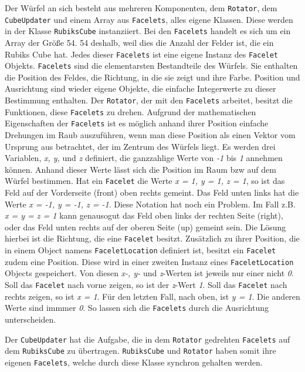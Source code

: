 Der Würfel an sich besteht aus mehreren Komponenten, dem \texttt{Rotator}, dem \texttt{CubeUpdater}
und einem Array aus \texttt{Facelets}, alles eigene Klassen. Diese werden in der Klasse
\texttt{RubiksCube} instanziiert. Bei den \texttt{Facelets} handelt es sich um ein
Array der Größe 54. 54 deshalb, weil dies die Anzahl der Felder ist, die ein
Rubiks Cube hat. Jedes dieser \texttt{Facelets} ist eine eigene Instanz des \texttt{Facelet} Objekts.
\texttt{Facelets} sind die elementarsten Bestandteile des Würfels. Sie enthalten die
Position des Feldes, die Richtung, in die sie zeigt und ihre Farbe. Position und
Ausrichtung sind wieder eigene Objekte, die einfache Integerwerte zu dieser
Bestimmung enthalten.
Der \texttt{Rotator}, der mit den \texttt{Facelets} arbeitet, besitzt die Funktionen, diese \texttt{Facelets}
zu drehen. Aufgrund der mathematischen Eigenschaften der \texttt{Facelets} ist es möglich
anhand ihrer Position einfache Drehungen im Raub auszuführen, wenn man diese
Position als einen Vektor vom Ursprung aus betrachtet, der im Zentrum des Würfels
liegt. Es werden drei Variablen, \emph{x, y,} und \emph{z} definiert, die ganzzahlige Werte
von \emph{-1} bis \emph{1} annehmen können. Anhand dieser Werte lässt sich die Position im Raum
bzw auf dem Würfel bestimmen. Hat ein \texttt{Facelet} die Werte \emph{x = 1, y = 1, z = 1}, so ist
das Feld auf der Vorderseite (front) oben rechts gemeint. Das Feld unten links hat die
Werte \emph{x = -1, y = -1, z = -1}. Diese Notation hat noch ein
Problem. Im Fall z.B. \emph{x = y = z = 1} kann genausogut das Feld oben links der rechten Seite (right), oder das Feld
unten rechts auf der oberen Seite (up) gemeint sein. Die Lösung hierbei ist die Richtung,
die eine \texttt{Facelet} besitzt. Zusätzlich zu ihrer Position, die in einem Object namens
\texttt{FaceletLocation} definiert ist, besitzt ein \texttt{Facelet} zudem eine Position. Diese wird
in einer zweiten Instanz eines \texttt{FaceletLocation} Objects gespeichert. Von diesen \emph{x-, y-} und \emph{z}-Werten
ist jeweils nur einer nicht \emph{0}. Soll das \texttt{Facelet} nach vorne zeigen, so ist der \emph{z}-Wert \emph{1}.
Soll das \texttt{Facelet} nach rechts zeigen, so ist \emph{x = 1}. Für den letzten Fall, nach oben, ist \emph{y = 1}.
Die anderen Werte sind immmer \emph{0}. So lassen sich die \texttt{Facelets} durch die Ausrichtung unterscheiden.

Der \texttt{CubeUpdater} hat die Aufgabe, die in dem \texttt{Rotator} gedrehten \texttt{Facelets} auf dem
\texttt{RubiksCube} zu übertragen. \texttt{RubiksCube} und \texttt{Rotator} haben somit ihre eigenen \texttt{Facelets},
welche durch diese Klasse synchron gehalten werden.

